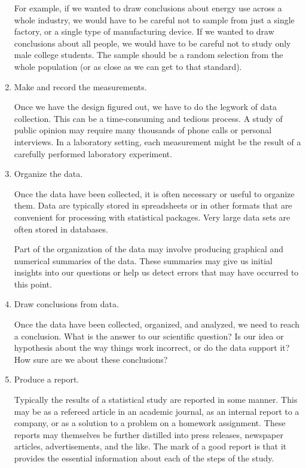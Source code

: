 \documentclass[twoside]{book}\usepackage[]{graphicx}\usepackage[]{xcolor}
\newcounter{example}[section]
\begin{document}
\begin{enumerate}
  For example, if we wanted to draw conclusions about energy use across a whole industry, we would have to be careful not to sample from just a single factory, or a single type of manufacturing device.  If we wanted to draw conclusions about all people, we would have to be careful not to study only male college students.  The sample should be a random selection from the whole population (or as close as we can get to that standard).	


  \item
	Make and record the measurements.

	Once we have the design figured out, we have to do the legwork of 
	data collection.  This can be a time-consuming and tedious process.
	A study of public opinion may require many thousands of phone calls or 
	personal interviews.
	In a laboratory setting, each measurement might be the result 
	of a carefully performed laboratory experiment.

  \item Organize the data.

	Once the data have been collected, it is often necessary or useful
	to organize them.  Data are typically stored in spreadsheets or 
	in other formats that are convenient for processing with 
	statistical packages.  Very large data sets are often stored in 
	databases.  
	
	Part of the organization of the data may involve producing graphical and
	numerical summaries of the data.  These summaries may give us initial
	insights into our questions or help us detect errors that may have occurred
	to this point.

  \item Draw conclusions from data.

	Once the data have been collected, organized, and analyzed, we need
	to reach a conclusion.  
	What is the answer to our scientific question? Is our idea or hypothesis about the way things work incorrect, or do the data support it? How sure are we about these conclusions?

  \item Produce a report.

		Typically the results of a statistical study are reported in 
		some manner.  This may be as a refereed article in an academic 
		journal, as an internal report to a company, or as a solution
		to a problem on a homework assignment.  These reports may themselves
		be further distilled into press releases, newspaper articles,
		advertisements, and the like.  The mark of a good report
		is that it provides the essential information about each 
		of the steps of the study.

\end{enumerate}
\end{document}
